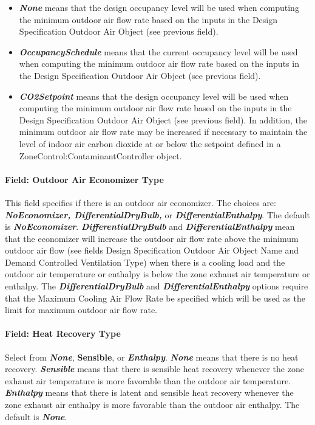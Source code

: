\begin{itemize}
\item
  \textbf{\emph{None}} means that the design occupancy level will be used when computing the minimum outdoor air flow rate based on the inputs in the Design Specification Outdoor Air Object (see previous field).
\item
  \textbf{\emph{OccupancySchedule}} means that the current occupancy level will be used when computing the minimum outdoor air flow rate based on the inputs in the Design Specification Outdoor Air Object (see previous field).
\item
  \textbf{\emph{CO2Setpoint}} means that the design occupancy level will be used when computing the minimum outdoor air flow rate based on the inputs in the Design Specification Outdoor Air Object (see previous field). In addition, the minimum outdoor air flow rate may be increased if necessary to maintain the level of indoor air carbon dioxide at or below the setpoint defined in a ZoneControl:ContaminantController object.
\end{itemize}

\paragraph{Field: Outdoor Air Economizer Type}\label{field-outdoor-air-economizer-type-000}

This field specifies if there is an outdoor air economizer. The choices are: \textbf{\emph{NoEconomizer, DifferentialDryBulb,}} or \textbf{\emph{DifferentialEnthalpy}}. The default is \textbf{\emph{NoEconomizer}}. \textbf{\emph{DifferentialDryBulb}} and \textbf{\emph{DifferentialEnthalpy}} mean that the economizer will increase the outdoor air flow rate above the minimum outdoor air flow (see fields Design Specification Outdoor Air Object Name and Demand Controlled Ventilation Type) when there is a cooling load and the outdoor air temperature or enthalpy is below the zone exhaust air temperature or enthalpy. The \textbf{\emph{DifferentialDryBulb}} and \textbf{\emph{DifferentialEnthalpy}} options require that the Maximum Cooling Air Flow Rate be specified which will be used as the limit for maximum outdoor air flow rate.

\paragraph{Field: Heat Recovery Type}\label{field-heat-recovery-type-000}

Select from \textbf{\emph{None}}, \textbf{Sensible}, or \textbf{\emph{Enthalpy}}. \textbf{\emph{None}} means that there is no heat recovery. \textbf{\emph{Sensible}} means that there is sensible heat recovery whenever the zone exhaust air temperature is more favorable than the outdoor air temperature. \textbf{\emph{Enthalpy}} means that there is latent and sensible heat recovery whenever the zone exhaust air enthalpy is more favorable than the outdoor air enthalpy. The default is \textbf{\emph{None}}.

